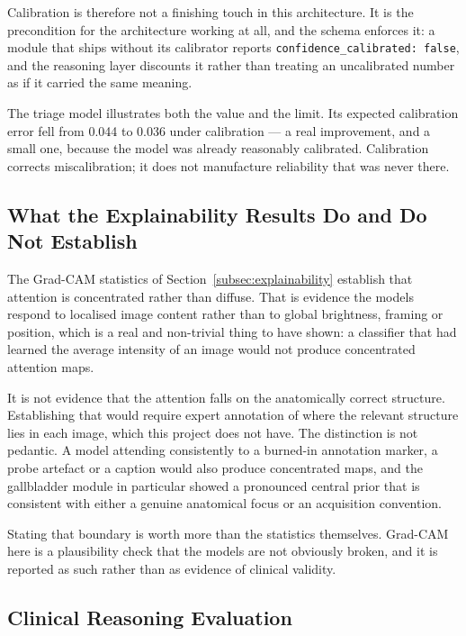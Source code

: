 Calibration is therefore not a finishing touch in this architecture. It is the precondition
for the architecture working at all, and the schema enforces it: a module that ships without
its calibrator reports \texttt{confidence\_calibrated: false}, and the reasoning layer
discounts it rather than treating an uncalibrated number as if it carried the same meaning.

The triage model illustrates both the value and the limit. Its expected calibration error fell
from 0.044 to 0.036 under calibration --- a real improvement, and a small one, because the
model was already reasonably calibrated. Calibration corrects miscalibration; it does not
manufacture reliability that was never there.

\subsection{What the Explainability Results Do and Do Not Establish}
\label{subsec:results-explainability}

The Grad-CAM statistics of Section~\ref{subsec:explainability} establish that attention is
concentrated rather than diffuse. That is evidence the models respond to localised image
content rather than to global brightness, framing or position, which is a real and
non-trivial thing to have shown: a classifier that had learned the average intensity of an
image would not produce concentrated attention maps.

It is not evidence that the attention falls on the anatomically correct structure. Establishing
that would require expert annotation of where the relevant structure lies in each image, which
this project does not have. The distinction is not pedantic. A model attending consistently to
a burned-in annotation marker, a probe artefact or a caption would also produce concentrated
maps, and the gallbladder module in particular showed a pronounced central prior that is
consistent with either a genuine anatomical focus or an acquisition convention.

Stating that boundary is worth more than the statistics themselves. Grad-CAM here is a
plausibility check that the models are not obviously broken, and it is reported as such rather
than as evidence of clinical validity.

\subsection{Clinical Reasoning Evaluation}
\label{subsec:results-reasoning}

